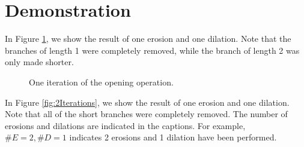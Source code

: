 \documentclass{InsightArticle}
\begin{document}
\section{Demonstration}
\label{sec:Demonstration}
In Figure \ref{fig:1Iteration}, we show the result of one erosion and one dilation. Note that the branches of length 1 were completely removed, while the branch of length 2 was only made shorter.
\begin{figure}[H]
\centering
{}
\caption{One iteration of the opening operation.}
\label{fig:1Iteration}
\end{figure}

In Figure \ref{fig:2Iterations}, we show the result of one erosion and one dilation. Note that all of the short branches were completely removed. The number of erosions and dilations are indicated in the captions. For example, $\#E=2, \#D=1$ indicates 2 erosions and 1 dilation have been performed.
\end{document}
